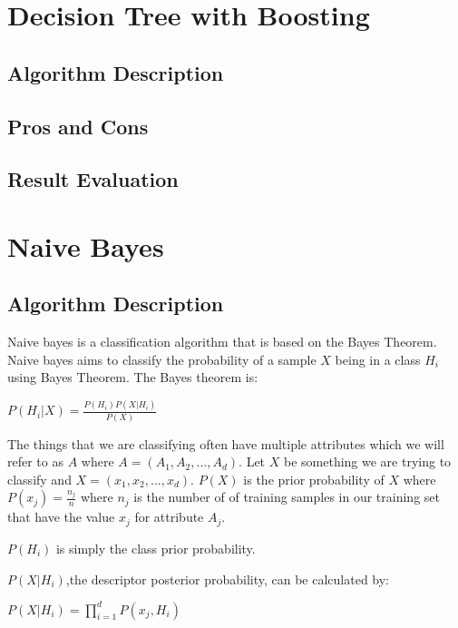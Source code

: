 \documentclass[paper=letter, fontsize=11pt]{article}
\numberwithin{equation}{section}		%
\numberwithin{figure}{section}			%
\numberwithin{table}{section}				%
\begin{document}
\section{Decision Tree with Boosting}
\subsection{Algorithm Description}
\subsection{Pros and Cons}

\subsection{Result Evaluation}

\section{Naive Bayes}
\subsection{Algorithm Description}
Naive bayes is a classification algorithm that is based on the Bayes Theorem. Naive bayes aims to classify the probability of a sample $X$ being in a class $H_i$ using Bayes Theorem. The Bayes theorem is:\\
\begin{center} $P(H_i|X) = \frac{P(H_i)P(X|H_i)}{P(X)}$ \end{center}

\noindent The things that we are classifying often have multiple attributes which we will refer to as $A$ where $A = (A_1,A_2,...,A_d)$. Let $X$ be something we are trying to classify and $X = (x_1, x_2, ..., x_d)$. $P(X)$ is the prior probability of $X$ where $P(x_j) = \frac{n_j}{n}$ where $n_j$ is the number of of training samples in our training set that have the value $x_j$ for attribute $A_j$. 

$P(H_i)$ is simply the class prior probability. 

$P(X|H_i)$,the descriptor posterior probability, can be calculated by:

\begin{center} $P(X|H_i) = \prod_{i=1}^{d} P(x_j, H_i)$ \end{center}
\end{document}

